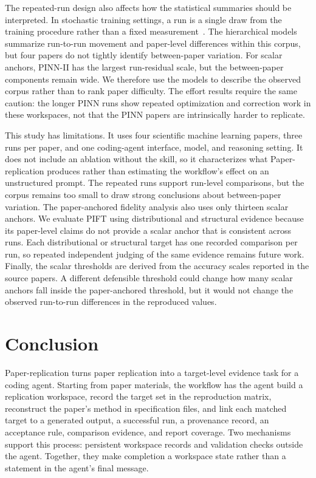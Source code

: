 \documentclass[authoryear,5p,times,nopreprintline]{elsarticle}
\begin{document}
The repeated-run design also affects how the statistical summaries should be interpreted.
In stochastic training settings, a run is a single draw from the training procedure rather than a fixed measurement~\citep{bouthillier2021accounting}.
The hierarchical models summarize run-to-run movement and paper-level differences within this corpus, but four papers do not tightly identify between-paper variation.
For scalar anchors, PINN-II has the largest run-residual scale, but the between-paper components remain wide.
We therefore use the models to describe the observed corpus rather than to rank paper difficulty.
The effort results require the same caution: the longer PINN runs show repeated optimization and correction work in these workspaces, not that the PINN papers are intrinsically harder to replicate.

This study has limitations.
It uses four scientific machine learning papers, three runs per paper, and one coding-agent interface, model, and reasoning setting.
It does not include an ablation without the skill, so it characterizes what Paper-replication produces rather than estimating the workflow's effect on an unstructured prompt.
The repeated runs support run-level comparisons, but the corpus remains too small to draw strong conclusions about between-paper variation.
The paper-anchored fidelity analysis also uses only thirteen scalar anchors.
We evaluate PIFT using distributional and structural evidence because its paper-level claims do not provide a scalar anchor that is consistent across runs.
Each distributional or structural target has one recorded comparison per run, so repeated independent judging of the same evidence remains future work.
Finally, the scalar thresholds are derived from the accuracy scales reported in the source papers.
A different defensible threshold could change how many scalar anchors fall inside the paper-anchored threshold, but it would not change the observed run-to-run differences in the reproduced values.

\section{Conclusion}\label{sec:conclusion}
Paper-replication turns paper replication into a target-level evidence task for a coding agent.
Starting from paper materials, the workflow has the agent build a replication workspace, record the target set in the reproduction matrix, reconstruct the paper's method in specification files, and link each matched target to a generated output, a successful run, a provenance record, an acceptance rule, comparison evidence, and report coverage.
Two mechanisms support this process: persistent workspace records and validation checks outside the agent.
Together, they make completion a workspace state rather than a statement in the agent's final message.
\end{document}
